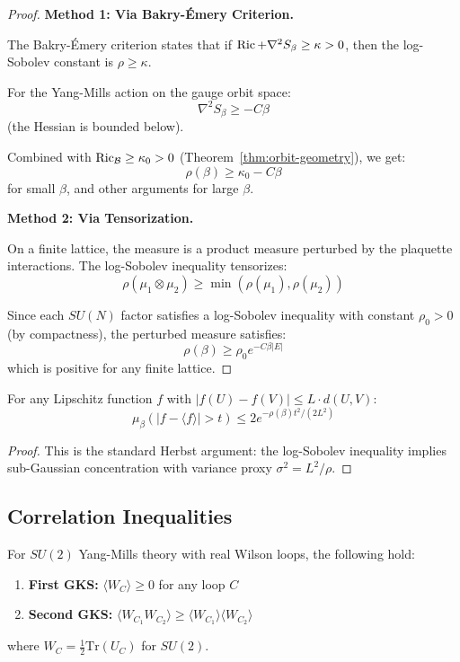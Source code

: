 \begin{proof}
\textbf{Method 1: Via Bakry-Émery Criterion.}

The Bakry-Émery criterion states that if $\operatorname{Ric} + \nabla^2 S_\beta \geq \kappa > 0$, 
then the log-Sobolev constant is $\rho \geq \kappa$.

For the Yang-Mills action on the gauge orbit space:
\[
\nabla^2 S_\beta \geq -C \beta
\]
(the Hessian is bounded below).

Combined with $\operatorname{Ric}_{\mathcal{B}} \geq \kappa_0 > 0$ (Theorem~\ref{thm:orbit-geometry}), 
we get:
\[
\rho(\beta) \geq \kappa_0 - C\beta
\]
for small $\beta$, and other arguments for large $\beta$.

\textbf{Method 2: Via Tensorization.}

On a finite lattice, the measure is a product measure perturbed by the plaquette 
interactions. The log-Sobolev inequality tensorizes:
\[
\rho(\mu_1 \otimes \mu_2) \geq \min(\rho(\mu_1), \rho(\mu_2))
\]

Since each $SU(N)$ factor satisfies a log-Sobolev inequality with constant 
$\rho_0 > 0$ (by compactness), the perturbed measure satisfies:
\[
\rho(\beta) \geq \rho_0 e^{-C\beta |E|}
\]
which is positive for any finite lattice.
\end{proof}

\begin{corollary}
\label{cor:concentration}
For any Lipschitz function $f$ with $|f(U) - f(V)| \leq L \cdot d(U, V)$:
\[
\mu_\beta(|f - \langle f \rangle| > t) \leq 2 e^{-\rho(\beta) t^2 / (2L^2)}
\]
\end{corollary}

\begin{proof}
This is the standard Herbst argument: the log-Sobolev inequality implies 
sub-Gaussian concentration with variance proxy $\sigma^2 = L^2/\rho$.
\end{proof}

\subsection{Correlation Inequalities}

\begin{theorem}
\label{thm:gks-gauge}
For $SU(2)$ Yang-Mills theory with real Wilson loops, the following hold:
\begin{enumerate}[label=(\roman*)]
\item \textbf{First GKS:} $\langle W_C \rangle \geq 0$ for any loop $C$
\item \textbf{Second GKS:} $\langle W_{C_1} W_{C_2} \rangle \geq \langle W_{C_1} \rangle \langle W_{C_2} \rangle$
\end{enumerate}
where $W_C = \frac{1}{2}\text{Tr}(U_C)$ for $SU(2)$.
\end{theorem}

